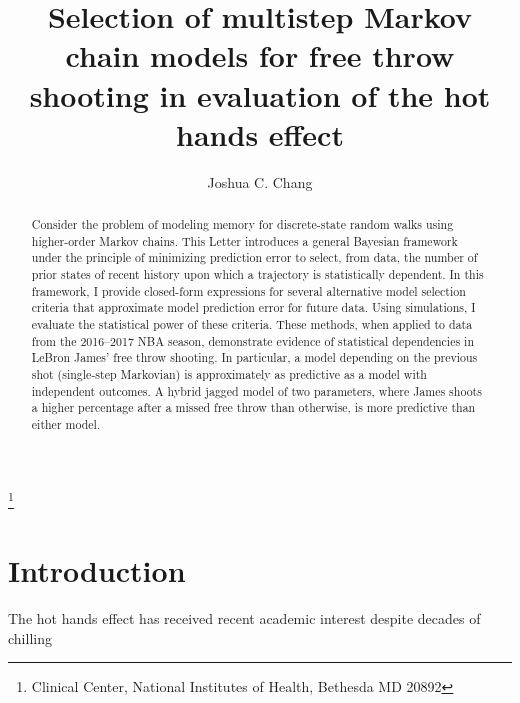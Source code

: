 \documentclass{IOS-Book-Article}
\begin{document}
\pagestyle{headings}
\def\thepage{}

\begin{frontmatter}              %
\author{Joshua C. Chang}
\thanks{Clinical Center, National Institutes of Health, Bethesda MD 20892}
  

\title{Selection of multistep Markov chain models for free throw shooting in evaluation of the hot hands effect}
       

\begin{abstract}

Consider the problem of modeling memory for discrete-state random walks using higher-order Markov chains.  This Letter introduces a general Bayesian framework under the principle of minimizing prediction error to select, from data, the number of prior states of recent history upon which a trajectory is statistically dependent. In this framework, I provide closed-form expressions for several alternative model selection criteria that approximate model prediction error for future data. Using simulations, I evaluate the statistical power of these criteria. These methods, when applied to data from the 2016--2017 NBA season, demonstrate evidence of statistical dependencies in LeBron James' free throw shooting. In particular, a model depending on the previous shot (single-step Markovian) is approximately as predictive as a model with independent outcomes. A hybrid jagged model of two parameters, where James shoots a higher percentage after a missed free throw than otherwise, is more predictive than either model.


\end{abstract}

\end{frontmatter}


\section{Introduction}

The hot hands effect has received recent academic interest despite decades of chilling
\end{document}
